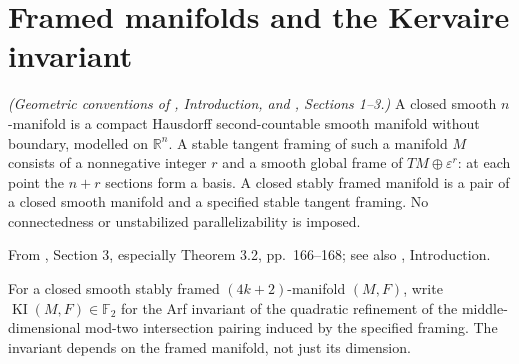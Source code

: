 \section{Framed manifolds and the Kervaire invariant}

\begin{definition}
\label{sem:Literature:closed-framed-manifolds}
\textit{(Geometric conventions of \cite{LWX126}, Introduction, and \cite{Browder}, Sections 1--3.)}
A closed smooth $n$-manifold is a compact Hausdorff second-countable smooth
manifold without boundary, modelled on $\mathbb R^n$. A stable tangent
framing of such a manifold $M$ consists of a nonnegative integer $r$ and a
smooth global frame of $TM\oplus\varepsilon^r$: at each point the $n+r$
sections form a basis. A closed stably framed manifold is a pair of a
closed smooth manifold and a specified stable tangent framing.
No connectedness or unstabilized parallelizability is imposed.
\end{definition}

\begin{definition}
\label{sem:Literature:kervaire-invariant}
From \cite{Browder}, Section 3, especially Theorem 3.2, pp.~166--168; see also \cite{LWX126}, Introduction.\par
For a closed smooth stably framed $(4k+2)$-manifold $(M,F)$, write
$\operatorname{KI}(M,F)\in\mathbb F_2$ for the Arf invariant of the
quadratic refinement of the middle-dimensional mod-two intersection pairing
induced by the specified framing. The invariant depends on the framed
manifold, not just its dimension.
\end{definition}

